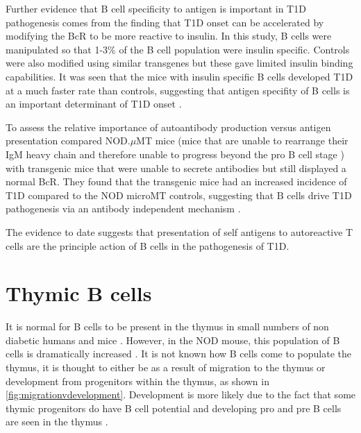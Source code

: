 Further evidence that B cell specificity to antigen is important in T1D pathogenesis comes from the finding that T1D onset can be accelerated by modifying the BcR to be more reactive to insulin.
In this study, B cells were manipulated so that 1-3\% of the B cell population were insulin specific.
Controls were also modified using similar transgenes but these gave limited insulin binding capabilities.
It was seen that the mice with insulin specific B cells developed T1D at a much faster rate than controls, suggesting that antigen specifity of B cells is an important determinant of T1D onset \citep{Hulbert2001}.

To assess the relative importance of autoantibody production versus antigen presentation \citet{Wong2004} compared NOD.$\mu$MT mice (mice that are unable to rearrange their IgM heavy chain and therefore unable to progress beyond the pro B cell stage ) with transgenic mice that were unable to secrete antibodies but still displayed a normal BcR.
They found that the transgenic mice had an increased incidence of T1D compared to the NOD microMT controls, suggesting that B cells drive T1D pathogenesis via an antibody independent mechanism \citep{Wong2004}.

The evidence to date suggests that presentation of self antigens to autoreactive T cells are the principle action of B cells in the pathogenesis of T1D.






\section{Thymic B cells}
 
It is normal for B cells to be present in the thymus in small numbers \citep{Isaacson1987, Akashi2000, Miyama1988} of non diabetic humans \citep{Isaacson1987} and mice \citep{Akashi2000}. 
However, in the NOD mouse, this population of B cells is dramatically increased \citep{OReilly1994, Serreze1998}.
It is not known how B cells come to populate the thymus, it is thought to either be as a result of migration to the thymus or development from progenitors within the thymus, as shown in \cref{fig:migrationvdevelopment}.
Development is more likely due to the fact that some thymic progenitors do have B cell potential \citep{Porritt2004} and developing pro and pre B cells are seen in the thymus \citep{Akashi2000}.

